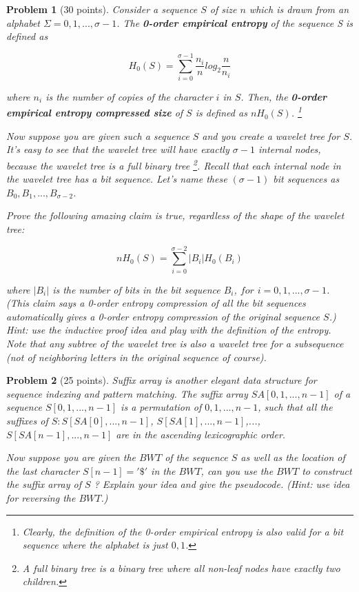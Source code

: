 \documentclass[11pt]{article}
\newtheorem{problem}{Problem}
\begin{document}
\begin{problem}[30 points]
\label{prob:3}
Consider a sequence $S$ of size $n$ which is drawn from an alphabet $\Sigma = {0, 1,..., σ − 1}$. The
\textbf{0-order empirical entropy} of the sequence S is defined as

$$
H_0(S) = \sum_{i=0}^{\sigma-1} \frac{n_i}{n} log_2 \frac{n}{n_i}
$$

where $n_i$ is the number of copies of the character $i$ in $S$. Then, the \textbf{0-order empirical entropy compressed size} of $S$
is defined as $nH_0(S)$. \footnote{Clearly, the definition of the 0-order empirical entropy is also valid for a bit sequence where the alphabet is just ${0, 1}$.} %

Now suppose you are given such a sequence $S$ and you create a wavelet tree for $S$. It’s easy to see that the wavelet
tree will have exactly $\sigma-1$ internal nodes, because the wavelet tree is a full binary tree \footnote{A full binary tree is a binary tree where all non-leaf nodes have exactly two children.}. Recall that each internal
node in the wavelet tree has a bit sequence. Let’s name these $(\sigma-1)$ bit sequences as $B_0, B_1,...,B_{\sigma-2}$.

Prove the following amazing claim is true, regardless of the shape of the wavelet tree:

$$
nH_0(S) = \sum_{i=0}^{\sigma-2}|B_i|H_0(B_i)
$$

where $|B_i|$ is the number of bits in the bit sequence $B_i$, $for$ $i = 0, 1,..., \sigma-1$. (This claim says a 0-order entropy
compression of all the bit sequences automatically gives a 0-order entropy compression of the original sequence $S$.)
Hint: use the inductive proof idea and play with the definition of the entropy. Note that any subtree of the wavelet
tree is also a wavelet tree for a subsequence (not of neighboring letters in the original sequence of course).

\end{problem}




\begin{problem}[25 points]
\label{prob:4}
Suffix array is another elegant data structure for sequence indexing and pattern matching.
The suffix array $SA[0, 1,...,n-1]$ of a sequence $S[0,1,...,n-1]$ is a permutation of ${0, 1,...,n-1}$, such that
all the suffixes of $S: S[SA[0],...,n-1]$, $S[SA[1],...,n-1]$,...,$S[SA[n-1],...,n-1]$ are in the ascending
lexicographic order.

Now suppose you are given the $BWT$ of the sequence $S$ as well as the location of the last character $S[n-1] =' \$'$
in the $BWT$, can you use the $BWT$ to construct the suffix array of $S$ ? Explain your idea and give the pseudocode.
(Hint: use idea for reversing the $BWT$.)

\end{problem}
\end{document}
